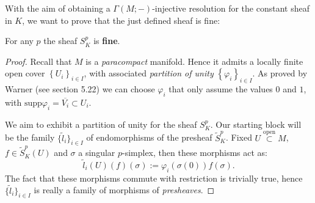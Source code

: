 With the aim of obtaining a $\Gamma(M;-)$-injective resolution for the constant sheaf in $K$, we want to prove that the just defined sheaf is fine:
\begin{lem}
	For any $p$ the sheaf $S^p_K$ is \textbf{fine}.
\end{lem} 
\begin{proof}
	Recall that $M$ is a \textit{paracompact} manifold.
	Hence it admits a locally finite open cover $\left\{ U_i \right\}_{i \in I}$, with associated \textit{partition of unity} $\left\{ \varphi_i \right\}_{i \in I}$.
	As proved by Warner (see \cite{warner} section 5.22) we can choose $\varphi_i$ that only assume the values $0$ and $1$, with $\mathrm{supp}\varphi_i = \overline{V_i} \subset U_i$.

	We aim to exhibit a partition of unity for the sheaf $S^p_K$.
	Our starting block will be the family $\big\{\widetilde{l}_i\big\}_{i \in I}$ of endomorphisms of the presheaf $\widetilde{S}_K^p$.
	Fixed $U \stackrel{\text{open}}{\subset} M$, $f \in \widetilde{S}_K^p(U)$ and $\sigma$ a singular $p$-simplex, then these morphisms act as:
	\begin{equation}
		\widetilde{l}_i(U) (f) (\sigma) := \varphi_i(\sigma(0)) f(\sigma)
	.\end{equation} 
	The fact that these morphisms commute with restriction is trivially true, hence $\big\{\widetilde{l}_i\big\}_{i \in I}$ is really a family of morphisms of \textit{presheaves}.


\end{proof}
